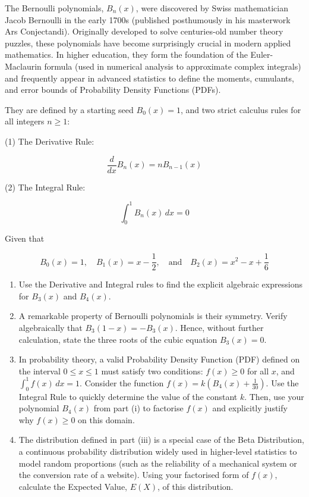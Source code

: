 \begin{problem}


The Bernoulli polynomials, $B_n(x)$, were discovered by Swiss mathematician Jacob Bernoulli in the early 1700s (published posthumously in his masterwork Ars Conjectandi). Originally developed to solve centuries-old number theory puzzles, these polynomials have become surprisingly crucial in modern applied mathematics. In higher education, they form the foundation of the Euler-Maclaurin formula (used in numerical analysis to approximate complex integrals) and frequently appear in advanced statistics to define the moments, cumulants, and error bounds of Probability Density Functions (PDFs).

They are defined by a starting seed $B_0(x) = 1$, and two strict calculus rules for all integers $n \ge 1$:

(1) The Derivative Rule: 

\[ \frac{d}{dx} B_n(x) = n B_{n-1}(x) \]

(2) The Integral Rule: 

\[ \int_0^1 B_n(x) \, dx = 0 \]

Given that 

\[
B_0(x) = 1, \quad B_1(x) = x - \frac{1}{2}, \quad \text{and} \quad B_2(x) = x^2 - x + \frac{1}{6}
\]

\begin{enumerate}[label=(\roman*)]
\item Use the Derivative and Integral rules to find the explicit algebraic expressions for $B_3(x)$ and $B_4(x)$.
\item A remarkable property of Bernoulli polynomials is their symmetry. Verify algebraically that $B_3(1-x) = -B_3(x)$. Hence, without further calculation, state the three roots of the cubic equation $B_3(x) = 0$.
\item In probability theory, a valid Probability Density Function (PDF) defined on the interval $0 \le x \le 1$ must satisfy two conditions: $f(x) \ge 0$ for all $x$, and $\int_0^1 f(x) \, dx = 1$.
Consider the function $f(x) = k \left( B_4(x) + \frac{1}{30} \right)$.
Use the Integral Rule to quickly determine the value of the constant $k$. Then, use your polynomial $B_4(x)$ from part (i) to factorise $f(x)$ and explicitly justify why $f(x) \ge 0$ on this domain.
\item The distribution defined in part (iii) is a special case of the Beta Distribution, a continuous probability distribution widely used in higher-level statistics to model random proportions (such as the reliability of a mechanical system or the conversion rate of a website).
Using your factorised form of $f(x)$, calculate the Expected Value, $E(X)$, of this distribution.


\end{enumerate}
\end{problem}

